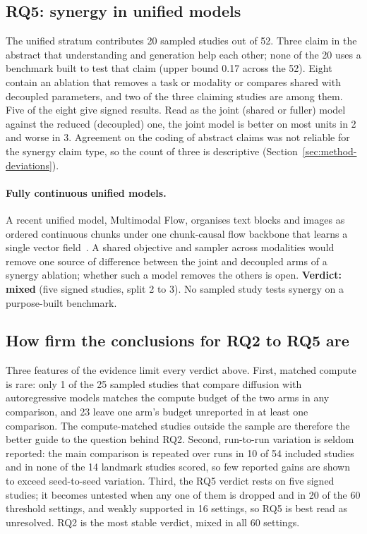 \subsection{RQ5: synergy in unified models}
\label{sec:rq5}
The unified stratum contributes 20 sampled studies out of 52. Three claim in the abstract that understanding and generation help each other; none of the 20 uses a benchmark built to test that claim (upper bound 0.17 across the 52). Eight contain an ablation that removes a task or modality or compares shared with decoupled parameters, and two of the three claiming studies are among them. Five of the eight give signed results. Read as the joint (shared or fuller) model against the reduced (decoupled) one, the joint model is better on most units in 2 and worse in 3. %
Agreement on the coding of abstract claims was not reliable for the synergy claim type, so the count of three is descriptive (Section~\ref{sec:method-deviations}).
\paragraph{Fully continuous unified models.} A recent unified model, Multimodal Flow, organises text blocks and images as ordered continuous chunks under one chunk-causal flow backbone that learns a single vector field~\cite{arXiv:2609.40362}. A shared objective and sampler across modalities would remove one source of difference between the joint and decoupled arms of a synergy ablation; whether such a model removes the others is open.
\textbf{Verdict: mixed} (five signed studies, split 2 to 3). No sampled study tests synergy on a purpose-built benchmark.

\subsection{How firm the conclusions for RQ2 to RQ5 are}
\label{sec:rq-firmness}
Three features of the evidence limit every verdict above. First, matched compute is rare: only 1 of the 25 sampled studies that compare diffusion with autoregressive models matches the compute budget of the two arms in any comparison, and 23 leave one arm's budget unreported in at least one comparison. The compute-matched studies outside the sample are therefore the better guide to the question behind RQ2. Second, run-to-run variation is seldom reported: the main comparison is repeated over runs in 10 of 54 included studies and in none of the 14 landmark studies scored, so few reported gains are shown to exceed seed-to-seed variation. Third, the RQ5 verdict rests on five signed studies; it becomes untested when any one of them is dropped and in 20 of the 60 threshold settings, and weakly supported in 16 settings, so RQ5 is best read as unresolved. RQ2 is the most stable verdict, mixed in all 60 settings.

